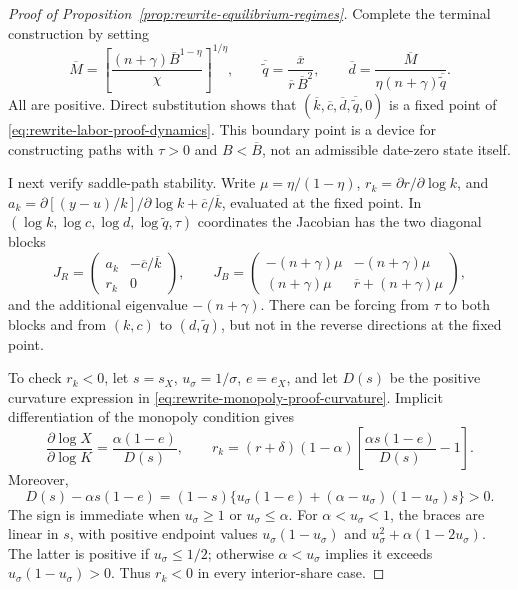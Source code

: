 \begin{proof}[Proof of Proposition~\ref{prop:rewrite-equilibrium-regimes}]
Complete the terminal construction by setting
\begin{equation}
 \overline M=
 \left[\frac{(n+\gamma)\overline B^{1-\eta}}{\chi}\right]^{1/\eta},
 \qquad
 \overline{\widetilde q}=\frac{\overline x}{\overline r\,\overline B^2},
 \qquad
 \overline d=\frac{\overline M}{\eta(n+\gamma)\overline{\widetilde q}}.
 \label{eq:rewrite-labor-terminal-research}
\end{equation}
All are positive. Direct substitution shows that
$(\overline k,\overline c,\overline d,\overline{\widetilde q},0)$
is a fixed point of \eqref{eq:rewrite-labor-proof-dynamics}.
This boundary point is a device for constructing paths with $\tau>0$ and
$B<\overline B$, not an admissible date-zero state itself.

I next verify saddle-path stability. Write $\mu=\eta/(1-\eta)$,
$r_k=\partial r/\partial\log k$, and
$a_k=\partial[(y-u)/k]/\partial\log k+\overline c/\overline k$,
evaluated at the fixed point. In
$(\log k,\log c,\log d,\log\widetilde q,\tau)$ coordinates the Jacobian has
the two diagonal blocks
\begin{equation}
 J_R=\begin{pmatrix}
 a_k&-\overline c/\overline k\\ r_k&0
 \end{pmatrix},
 \qquad
 J_B=\begin{pmatrix}
 -(n+\gamma)\mu&-(n+\gamma)\mu\\
 (n+\gamma)\mu&\overline r+(n+\gamma)\mu
 \end{pmatrix},
 \label{eq:rewrite-labor-proof-blocks}
\end{equation}
and the additional eigenvalue $-(n+\gamma)$. There can be forcing from
$\tau$ to both blocks and from $(k,c)$ to $(d,\widetilde q)$, but not in the
reverse directions at the fixed point.

To check $r_k<0$, let $s=s_X$, $u_\sigma=1/\sigma$, $e=e_X$, and let $D(s)$
be the positive curvature expression in
\eqref{eq:rewrite-monopoly-proof-curvature}. Implicit differentiation of the
monopoly condition gives
\[
 \frac{\partial\log X}{\partial\log K}
 =\frac{\alpha(1-e)}{D(s)},\qquad
 r_k=(r+\delta)(1-\alpha)
 \left[\frac{\alpha s(1-e)}{D(s)}-1\right].
\]
Moreover,
\[
 D(s)-\alpha s(1-e)
 =(1-s)\{u_\sigma(1-e)+
       (\alpha-u_\sigma)(1-u_\sigma)s\}>0.
\]
The sign is immediate when $u_\sigma\geq1$ or $u_\sigma\leq\alpha$.
For $\alpha<u_\sigma<1$, the braces are linear in $s$, with positive
endpoint values $u_\sigma(1-u_\sigma)$ and
$u_\sigma^2+\alpha(1-2u_\sigma)$.
The latter is positive if $u_\sigma\leq1/2$; otherwise $\alpha<u_\sigma$
implies it exceeds $u_\sigma(1-u_\sigma)>0$.
Thus $r_k<0$ in every interior-share case.


\end{proof}
